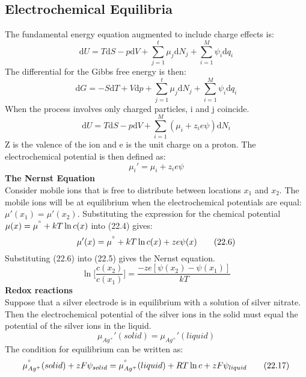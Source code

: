 \documentclass[8pt]{article}
\numberwithin{equation}{section}
\begin{document}
\begin{multicols}{2}
\section{Electrochemical Equilibria}
The fundamental energy equation augmented to include charge effects is: 
\begin{equation}
\mathrm{d}U=T\mathrm{d}S-p\mathrm{d}V+\sum_{j=1}^{t}\mu_{j}\mathrm{d}N_{j}+\sum_{i=1}^{M}\psi_{i}\mathrm{d}q_{i} \tag{22.1}
\end{equation}
The differential for the Gibbs free energy is then: 
\begin{equation}
\mathrm{d}G=-S\mathrm{d}T+V\mathrm{d}p+\sum_{j=1}^{t}\mu_{j}\mathrm{d}N_{j}+\sum_{i=1}^{M}\psi_{i}\mathrm{d}q_{i} \tag{22.2}
\end{equation}
When the process involves only charged particles, i and j coincide. 
\begin{equation}
\mathrm{d}U=T\mathrm{d}S-p\mathrm{d}V+\sum_{i=1}^{M}(\mu_{i}+z_{i}e\psi)\mathrm{d}N_{i} \tag{22.3}
\end{equation}
Z is the valence of the ion and e is the unit charge on a proton. The electrochemical potential is then defined as: 
\begin{equation}
\mu_{i}'=\mu_{i}+z_{i}e\psi \tag{22.4}
\end{equation}
\textbf{The Nernst Equation}\\ 
Consider mobile ions that is free to distribute between locations $x_{1}$ and $x_{2}$. The mobile ions will be at equilibrium when the electrochemical potentials are equal: $\mu'(x_{1})=\mu'(x_{2})$. Substituting the expression for the chemical potential $\mu (x)=\mu^{\degree}+kT\ln{c(x)}$ into (22.4) gives: 
\begin{equation}
\mu '(x)=\mu^{\degree}+kT\ln{c(x)}+ze\psi(x) \tag{22.6}
\end{equation}
Substituting (22.6) into (22.5) gives the Nernst equation.
\begin{equation}
\ln{\bigg[\frac{c(x_{2})}{c(x_{1})} \bigg]}=\frac{-ze[\psi (x_{2})-\psi (x_{1})]}{kT} \tag{22.7}
\end{equation}
\textbf{Redox reactions}\\
Suppose that a silver electrode is in equilibrium with a solution of silver nitrate. Then the electrochemical potential of the silver ions in the solid must equal the potential of the silver ions in the liquid. 
\begin{equation}
\mu_{Ag^{+}}'(solid)=\mu_{Ag^{+}}'(liquid)
\end{equation}
The condition for equilibrium can be written as: 
\begin{equation}
\mu_{Ag^{+}}^{\degree}(solid)+zF\psi_{solid}=\mu_{Ag^{+}}^{\degree}(liquid)+RT\ln{c}+zF\psi_{liquid} \tag{22.17}
\end{equation}
\setcounter{section}{23}

\end{multicols}
\end{document}
